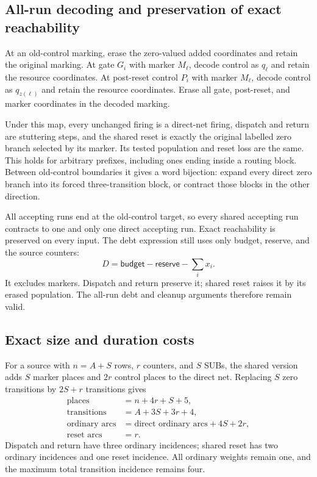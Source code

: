 \documentclass[11pt,letterpaper]{article}
\theoremstyle{definition}
\theoremstyle{remark}
\newcommand{\res}{\mathsf{reserve}}
\newcommand{\bud}{\mathsf{budget}}
\begin{document}
\subsection{All-run decoding and preservation of exact reachability}
At an old-control marking, erase the zero-valued added coordinates and retain the original marking. At gate $G_i$ with marker $M_\ell$, decode control as $q_\ell$ and retain the resource coordinates. At post-reset control $P_i$ with marker $M_\ell$, decode control as $q_{z(\ell)}$ and retain the resource coordinates. Erase all gate, post-reset, and marker coordinates in the decoded marking.

Under this map, every unchanged firing is a direct-net firing, dispatch and return are stuttering steps, and the shared reset is exactly the original labelled zero branch selected by its marker. Its tested population and reset loss are the same. This holds for arbitrary prefixes, including ones ending inside a routing block. Between old-control boundaries it gives a word bijection: expand every direct zero branch into its forced three-transition block, or contract those blocks in the other direction.

All accepting runs end at the old-control target, so every shared accepting run contracts to one and only one direct accepting run. Exact reachability is preserved on every input. The debt expression still uses only budget, reserve, and the source counters:
\[
 D=\bud-\res-\sum_i x_i.
\]
It excludes markers. Dispatch and return preserve it; shared reset raises it by its erased population. The all-run debt and cleanup arguments therefore remain valid.

\subsection{Exact size and duration costs}
For a source with $n=A+S$ rows, $r$ counters, and $S$ SUBs, the shared version adds $S$ marker places and $2r$ control places to the direct net. Replacing $S$ zero transitions by $2S+r$ transitions gives
\begin{align*}
 \text{places}&=n+4r+S+5,\\
 \text{transitions}&=A+3S+3r+4,\\
 \text{ordinary arcs}&=\text{direct ordinary arcs}+4S+2r,\\
 \text{reset arcs}&=r.
\end{align*}
Dispatch and return have three ordinary incidences; shared reset has two ordinary incidences and one reset incidence. All ordinary weights remain one, and the maximum total transition incidence remains four.
\end{document}
